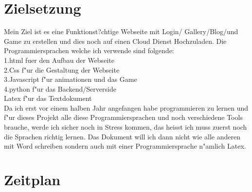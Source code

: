 \documentclass{article}
\renewcommand{\footrulewidth}{0pt}
\renewcommand{\contentsname}{Inhalt}
\begin{document}
\renewcommand{\contentsname}{Inhaltsverzeichnis}
\tableofcontents
\renewcommand{\footrulewidth}{3pt}
\cleardoublepage
\listoffigures
{}
\cleardoublepage

\section*{Zielsetzung}
Mein Ziel ist es eine Funktionst?chtige Webseite mit Login/ Gallery/Blog/und Game zu erstellen und dies noch auf einen Cloud Dienst Hochzuladen.
Die Programmiersprachen welche ich verwende sind folgende:\\
1.html fuer den Aufbau der Webseite\\
2.Css f"ur die Gestaltung der Webseite\\
3.Javascript f"ur animationen und das Game\\
4.python f"ur das Backend/Serverside\\
Latex f"ur das Textdokument\\
Da ich erst vor einem halben Jahr angefangen habe programmieren zu lernen und f"ur dieses Projekt alle diese Programmiersprachen und noch verschiedene
Tools brauche, werde ich sicher noch in Stress kommen, das heisst ich muss zuerst noch die Sprachen richtig lernen.
Das Dokument will ich dann nicht wie alle anderen mit Word schreiben sondern auch mit einer Programmiersprache n"amlich Latex.
\cleardoublepage



\setcounter{page}{1}%





\section{Zeitplan}

\end{document}
